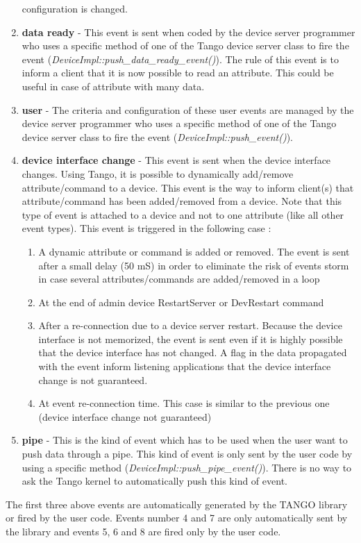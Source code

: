 \begin{enumerate}
configuration is changed.
\item \textbf{data ready} - This event is sent when coded by the device
server programmer who uses a specific method of one of the Tango device
server class to fire the event (\emph{DeviceImpl::push\_data\_ready\_event()}).
The rule of this event is to inform a client that it is now possible
to read an attribute. This could be useful in case of attribute with
many data.
\item \textbf{user} - The criteria and configuration of these user events
are managed by the device server programmer who uses a specific method
of one of the Tango device server class to fire the event (\emph{DeviceImpl::push\_event()}).
\item \textbf{device interface change} - This event is sent when the device
interface changes. Using Tango, it is possible to dynamically add/remove
attribute/command to a device. This event is the way to inform client(s)
that attribute/command has been added/removed from a device. Note
that this type of event is attached to a device and not to one attribute
(like all other event types). This event is triggered in the following
case :

\begin{enumerate}
\item A dynamic attribute or command is added or removed. The event is sent
after a small delay (50 mS) in order to eliminate the risk of events
storm in case several attributes/commands are added/removed in a loop 
\item At the end of admin device RestartServer or DevRestart command
\item After a re-connection due to a device server restart. Because the
device interface is not memorized, the event is sent even if it is
highly possible that the device interface has not changed. A flag
in the data propagated with the event inform listening applications
that the device interface change is not guaranteed. 
\item At event re-connection time. This case is similar to the previous
one (device interface change not guaranteed)
\end{enumerate}
\item \textbf{pipe} - This is the kind of event which has to be used when
the user want to push data through a pipe. This kind of event is only
sent by the user code by using a specific method (\emph{DeviceImpl::push\_pipe\_event()}).
There is no way to ask the Tango kernel to automatically push this
kind of event.
\end{enumerate}
The first three above events are automatically generated by the TANGO
library or fired by the user code. Events number 4 and 7 are only
automatically sent by the library and events 5, 6 and 8 are fired
only by the user code.

